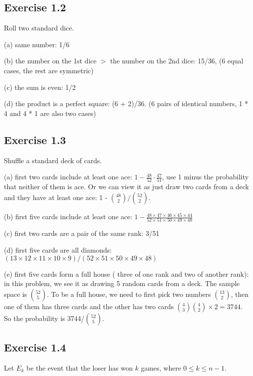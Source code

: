 \subsection*{Exercise 1.2}

Roll two standard dice.

\noindent (a) same number: 1/6

\noindent (b) the number on the 1st dice $>$ the number on the 2nd dice: 15/36, (6 equal cases, the rest are symmetric)

\noindent (c) the sum is even: 1/2

\noindent (d) the product is a perfect square: (6 + 2)/36. (6 pairs of identical numbers, 1 * 4 and 4 * 1 are also two cases)


\subsection*{Exercise 1.3}

Shuffle a standard deck of cards.

\noindent (a) first two cards include at least one ace: $1 - \frac{48}{52} \cdot \frac{47}{51}$, use 1 minus the probability
that neither of them is ace. Or we can view it as just draw two cards from a deck and they have at least one ace: 
1 - $\binom{48}{2}/\binom{52}{2}$.


\noindent (b) first five cards include at least one ace: 
$1 - \frac{48 \times 47 \times 46 \times 45 \times 44}{52 \times 51 \times 50 \times 49 \times 48}$

\noindent (c) first two cards are a pair of the same rank: 3/51

\noindent (d) first five cards are all diamonds: $(13 \times 12 \times 11 \times 10 \times 9)/(52 \times 51 \times 50 \times 49 \times 48)$

\noindent (e) first five cards form a full house ( three of one rank and two of another rank):
in this problem, we see it as drawing 5 random cards from a deck. The sample space is $\binom{52}{5}$. To be a full house, we need to
first pick two numbers $\binom{13}{2}$, then one of them has three cards and the other has two cards $\binom{4}{3} \binom{4}{2} \times 2 = 3744$.
So the probability is 3744/$\binom{52}{5}$.

\subsection*{Exercise 1.4}

Let $E_k$ be the event that the loser has won $k$ games, where $0 \leq k \leq n-1$.

